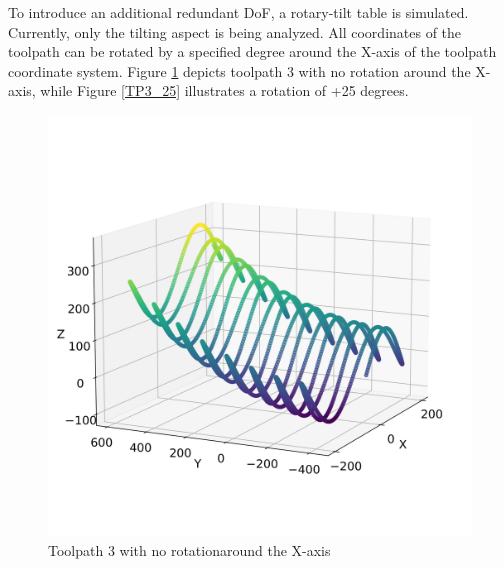 To introduce an additional redundant \acrshort{DoF}, a rotary-tilt table is simulated. Currently, only the tilting aspect is being analyzed. All coordinates of the toolpath can be rotated by a specified degree around the X-axis of the toolpath coordinate system. Figure \ref{TP3_0} depicts toolpath 3 with no rotation around the X-axis, while Figure \ref{TP3_25} illustrates a rotation of +25 degrees.

\begin{figure}[H]%
	\centering
	\begin{minipage}{0.5\textwidth}
		\includegraphics[width=\textwidth]{figures/path3_kipp_0_comparison.png}
		\caption{Toolpath 3 with no rotation\newline around the X-axis}
		\label{TP3_0}
	\end{minipage}\hfill
	\begin{minipage}{0.5\textwidth}

\end{minipage}
\end{figure}
